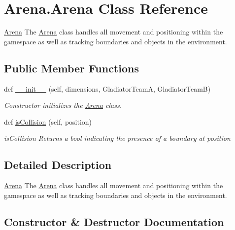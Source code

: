 \hypertarget{classArena_1_1Arena}{}\section{Arena.\+Arena Class Reference}
\label{classArena_1_1Arena}


\hyperlink{classArena_1_1Arena}{Arena} The \hyperlink{classArena_1_1Arena}{Arena} class handles all movement and positioning within the gamespace as well as tracking boundaries and objects in the environment.  


\subsection*{Public Member Functions}
\begin{DoxyCompactItemize}
\item 
def \hyperlink{classArena_1_1Arena_a86954a39b5b1ab78ebed13a4bee93179}{\+\_\+\+\_\+init\+\_\+\+\_\+} (self, dimensions, Gladiator\+Team\+A, Gladiator\+Team\+B)
\begin{DoxyCompactList}\small\item\em Constructor initializes the \hyperlink{classArena_1_1Arena}{Arena} class. \end{DoxyCompactList}\item 
def \hyperlink{classArena_1_1Arena_a52b533162634c7097fc101b0fafa906f}{is\+Collision} (self, position)
\begin{DoxyCompactList}\small\item\em is\+Collision Returns a bool indicating the presence of a boundary at position \end{DoxyCompactList}\end{DoxyCompactItemize}


\subsection{Detailed Description}
\hyperlink{classArena_1_1Arena}{Arena} The \hyperlink{classArena_1_1Arena}{Arena} class handles all movement and positioning within the gamespace as well as tracking boundaries and objects in the environment. 

\subsection{Constructor \& Destructor Documentation}
\hypertarget{classArena_1_1Arena_a86954a39b5b1ab78ebed13a4bee93179}{}
